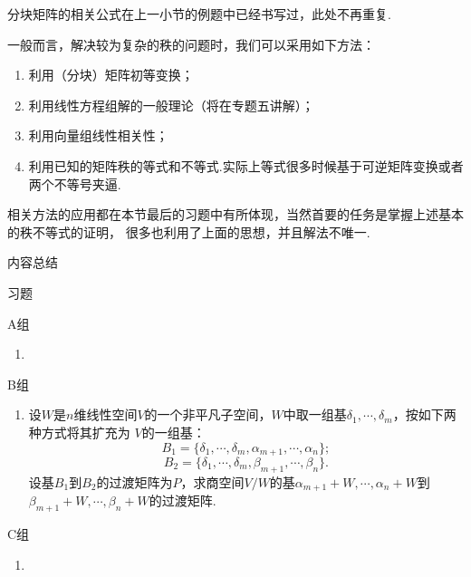 分块矩阵的相关公式在上一小节的例题中已经书写过，此处不再重复.

一般而言，解决较为复杂的秩的问题时，我们可以采用如下方法：
\begin{enumerate}
    \item 利用（分块）矩阵初等变换；

    \item 利用线性方程组解的一般理论（将在专题五讲解）；

    \item 利用向量组线性相关性；

    \item 利用已知的矩阵秩的等式和不等式.实际上等式很多时候基于可逆矩阵变换或者两个不等号夹逼.
\end{enumerate}

相关方法的应用都在本节最后的习题中有所体现，当然首要的任务是掌握上述基本的秩不等式的证明，
很多也利用了上面的思想，并且解法不唯一.

\vspace{2ex}
\centerline{\heiti \Large 内容总结}

\vspace{2ex}

\centerline{\heiti \Large 习题}
\vspace{2ex}
{\kaishu }
\begin{flushright}
    \kaishu

\end{flushright}
\centerline{\heiti A组}
\begin{enumerate}
    \item
\end{enumerate}
\centerline{\heiti B组}
\begin{enumerate}
    \item 设$W$是$n$维线性空间$V$的一个非平凡子空间，$W$中取一组基$\delta_1,\cdots,\delta_m$，按如下两种方式将其扩充为
	$V$的一组基：
	$$B_1=\{\delta_1,\cdots,\delta_m,\alpha_{m+1},\cdots,\alpha_n\};$$
	$$B_2=\{\delta_1,\cdots,\delta_m,\beta_{m+1},\cdots,\beta_n\}.$$
	设基$B_1$到$B_2$的过渡矩阵为$P$，求商空间$V/W$的基$\alpha_{m+1}+W,\cdots,\alpha_n+W$到
	$\beta_{m+1}+W,\cdots,\beta_n+W$的过渡矩阵.
\end{enumerate}
\centerline{\heiti C组}
\begin{enumerate}
    \item
\end{enumerate}
